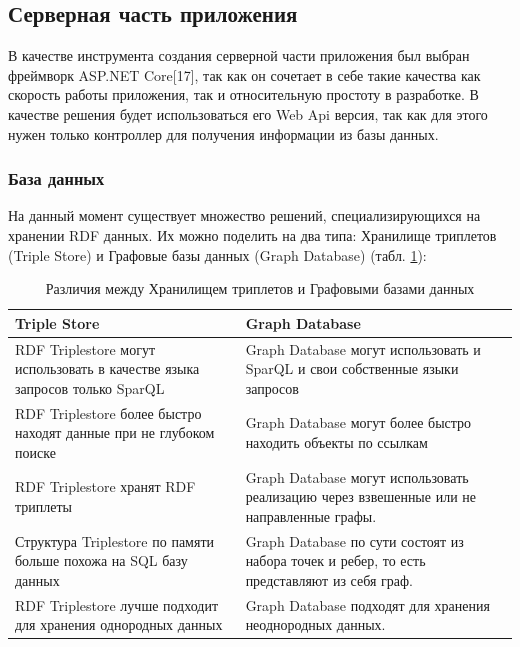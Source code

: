 \documentclass[12pt]{article}
\begin{document}
\subsection{Серверная часть приложения}
\qquad В качестве инструмента создания серверной части приложения был выбран фреймворк ASP.NET Core[17], так как он сочетает в себе такие качества как скорость работы приложения, так и относительную простоту в разработке. В качестве решения будет использоваться его Web Api версия, так как для этого нужен только контроллер для получения информации из базы данных.

\subsubsection{База данных}
\qquad На данный момент существует множество решений, специализирующихся на хранении RDF данных. Их можно поделить на два типа: Хранилище триплетов (Triple Store) и Графовые базы данных (Graph Database)  (табл. \ref{tbl:db_diff}):

\begin{table}[!ht]
    \centering
    \begin{tabular}{ | m{7cm} | m{8cm} | }
        \hline
        \textbf{Triple Store}                                                      & \textbf{Graph Database}                                                                    \\
        \hline
        RDF Triplestore могут использовать в качестве языка запросов только SparQL & Graph Database могут использовать и SparQL и свои собственные языки запросов               \\
        \hline
        RDF Triplestore более быстро находят данные при не глубоком поиске         & Graph Database могут более быстро находить объекты по ссылкам                              \\
        \hline
        RDF Triplestore хранят RDF триплеты                                        & Graph Database могут использовать реализацию через взвешенные или не направленные графы.   \\
        \hline
        Структура Triplestore по памяти больше похожа на SQL базу данных           & Graph Database по сути состоят из набора точек и ребер, то есть представляют из себя граф. \\
        \hline
        RDF Triplestore лучше подходит для хранения однородных данных              & Graph Database подходят для хранения неоднородных данных.                                  \\
        \hline
    \end{tabular}
    \caption{Различия между Хранилищем триплетов и Графовыми базами данных}
    \label{tbl:db_diff}
\end{table}
\end{document}
